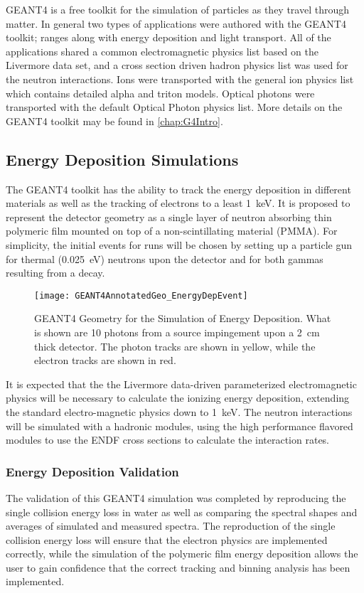 GEANT4 is a free toolkit for the simulation of particles as they travel through matter\cite{agostinelli_geant4simulation_2003}.
In general two types of applications were authored with the GEANT4 toolkit; ranges along with energy deposition and light transport.
All of the applications shared a common electromagnetic physics list based on the Livermore data set, and a cross section driven hadron physics list was used for the neutron interactions.
Ions were transported with the general ion physics list which contains detailed alpha and triton models.
Optical photons were transported with the default Optical Photon physics list.
More details on the GEANT4 toolkit may be found in \autoref{chap:G4Intro}.

\subsection{Energy Deposition Simulations}
\label{sec:EnergyDeposition}
The GEANT4 toolkit has the ability to track the energy deposition in different materials as well as the tracking of electrons to a least \SI{1}{\keV}\cite{agostinelli_geant4simulation_2003}.
It is proposed to represent the detector geometry as a single layer of neutron absorbing thin polymeric film mounted on top of a non-scintillating material (PMMA).
For simplicity, the initial events for runs will be chosen by setting up a particle gun for thermal (\SI{0.025}{\eV}) neutrons upon the detector and for both gammas resulting from a  decay.
\begin{figure}
  \texttt{[image: GEANT4AnnotatedGeo\_EnergyDepEvent]}
	\caption[GEANT4 Energy Deposition Geometry]{GEANT4 Geometry for the Simulation of Energy Deposition. What is shown are 10 photons from a  source impingement upon a \SI{2}{\cm} thick detector.  The photon tracks are shown in yellow, while the electron tracks are shown in red.}
	\label{fig:EDepSimGeo}
\end{figure}
It is expected that the the Livermore data-driven parameterized electromagnetic physics will be necessary to calculate the ionizing energy deposition, extending the standard electro-magnetic physics down to \SI{1}{\kilo\eV}.
The neutron interactions will be simulated with a hadronic modules, using the high performance flavored modules to use the ENDF cross sections to calculate the interaction rates.

\subsubsection{Energy Deposition Validation}
The validation of this GEANT4 simulation was completed by reproducing the single collision energy loss in water as well as comparing  the spectral shapes and averages of simulated and measured spectra.
The reproduction of the single collision energy loss will ensure that the electron physics are implemented correctly, while the simulation of the polymeric film energy deposition allows the user to gain confidence that the correct tracking and binning analysis has been implemented.

